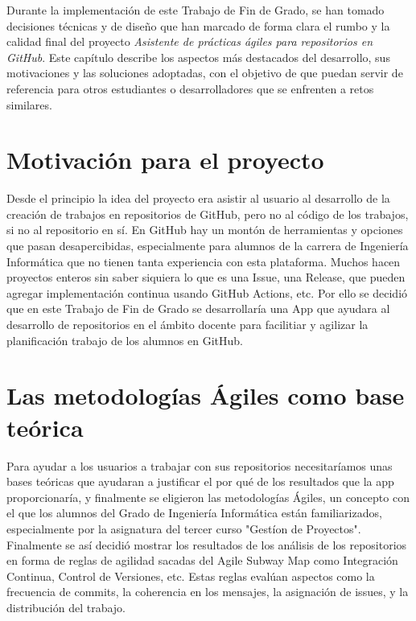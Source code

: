 
Durante la implementación de este Trabajo de Fin de Grado, se han tomado decisiones técnicas y de diseño que han marcado de forma clara el rumbo y la calidad final del proyecto \textit{Asistente de prácticas ágiles para repositorios en GitHub}. Este capítulo describe los aspectos más destacados del desarrollo, sus motivaciones y las soluciones adoptadas, con el objetivo de que puedan servir de referencia para otros estudiantes o desarrolladores que se enfrenten a retos similares.

\section{Motivación para el proyecto}
Desde el principio la idea del proyecto era asistir al usuario al desarrollo de la creación de trabajos en repositorios de GitHub, pero no al código de los trabajos, si no al repositorio en sí. En GitHub hay un montón de herramientas y opciones que pasan desapercibidas, especialmente para alumnos de la carrera de Ingeniería Informática que no tienen tanta experiencia con esta plataforma. Muchos hacen proyectos enteros sin saber siquiera lo que es una Issue, una Release, que pueden agregar implementación continua usando GitHub Actions, etc. Por ello se decidió que en este Trabajo de Fin de Grado se desarrollaría una App que ayudara al desarrollo de repositorios en el ámbito docente para facilitiar y agilizar la planificación trabajo de los alumnos en GitHub.

\section{Las metodologías Ágiles como base teórica}

Para ayudar a los usuarios a trabajar con sus repositorios necesitaríamos unas bases teóricas que ayudaran a justificar el por qué de los resultados que la app proporcionaría, y finalmente se eligieron las metodologías Ágiles, un concepto con el que los alumnos del Grado de Ingeniería Informática están familiarizados, especialmente por la asignatura del tercer curso "Gestíon de Proyectos". Finalmente se así decidió mostrar los resultados de los análisis de los repositorios en forma de reglas de agilidad sacadas del Agile Subway Map \cite{agileSubwayMap} como Integración Continua, Control de Versiones, etc. Estas reglas evalúan aspectos como la frecuencia de commits, la coherencia en los mensajes, la asignación de issues, y la distribución del trabajo.

